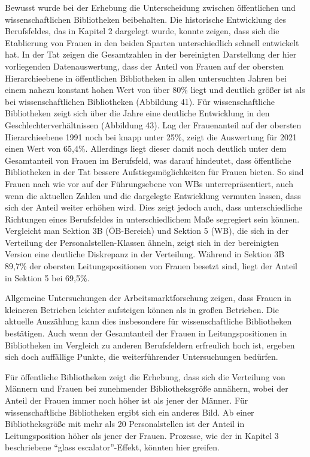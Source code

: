 \documentclass[a4paper,
fontsize=11pt,
oneside,
numbers=noperiodatend,
parskip=half-,
bibliography=totoc,
final
]{scrartcl}
\begin{document}
Bewusst wurde bei der Erhebung die Unterscheidung zwischen öffentlichen
und wissenschaftlichen Bibliotheken beibehalten. Die historische
Entwicklung des Berufsfeldes, das in Kapitel 2 dargelegt wurde, konnte
zeigen, dass sich die Etablierung von Frauen in den beiden Sparten
unterschiedlich schnell entwickelt hat. In der Tat zeigen die
Gesamtzahlen in der bereinigten Darstellung der hier vorliegenden
Datenauswertung, dass der Anteil von Frauen auf der obersten
Hierarchieebene in öffentlichen Bibliotheken in allen untersuchten
Jahren bei einem nahezu konstant hohen Wert von über 80\% liegt und
deutlich größer ist als bei wissenschaftlichen Bibliotheken (Abbildung
41). Für wissenschaftliche Bibliotheken zeigt sich über die Jahre eine
deutliche Entwicklung in den Geschlechterverhältnissen (Abbildung 43).
Lag der Frauenanteil auf der obersten Hierarchieebene 1991 noch bei
knapp unter 25\%, zeigt die Auswertung für 2021 einen Wert von 65,4\%.
Allerdings liegt dieser damit noch deutlich unter dem Gesamtanteil von
Frauen im Berufsfeld, was darauf hindeutet, dass öffentliche
Bibliotheken in der Tat bessere Aufstiegsmöglichkeiten für Frauen
bieten. So sind Frauen nach wie vor auf der Führungsebene von WBs
unterrepräsentiert, auch wenn die aktuellen Zahlen und die dargelegte
Entwicklung vermuten lassen, dass sich der Anteil weiter erhöhen wird.
Dies zeigt jedoch auch, dass unterschiedliche Richtungen eines
Berufsfeldes in unterschiedlichem Maße segregiert sein können.
Vergleicht man Sektion 3B (ÖB-Bereich) und Sektion 5 (WB), die sich in
der Verteilung der Personalstellen-Klassen ähneln, zeigt sich in der
bereinigten Version eine deutliche Diskrepanz in der Verteilung. Während
in Sektion 3B 89,7\% der obersten Leitungspositionen von Frauen besetzt
sind, liegt der Anteil in Sektion 5 bei 69,5\%.

Allgemeine Untersuchungen der Arbeitsmarktforschung zeigen, dass Frauen
in kleineren Betrieben leichter aufsteigen können als in großen
Betrieben. Die aktuelle Auszählung kann dies insbesondere für
wissenschaftliche Bibliotheken bestätigen. Auch wenn der Gesamtanteil
der Frauen in Leitungspositionen in Bibliotheken im Vergleich zu anderen
Berufsfeldern erfreulich hoch ist, ergeben sich doch auffällige Punkte,
die weiterführender Untersuchungen bedürfen.

Für öffentliche Bibliotheken zeigt die Erhebung, dass sich die
Verteilung von Männern und Frauen bei zunehmender Bibliotheksgröße
annähern, wobei der Anteil der Frauen immer noch höher ist als jener der
Männer. Für wissenschaftliche Bibliotheken ergibt sich ein anderes Bild.
Ab einer Bibliotheksgröße mit mehr als 20 Personalstellen ist der Anteil
in Leitungsposition höher als jener der Frauen. Prozesse, wie der in
Kapitel 3 beschriebene \enquote{glass escalator}-Effekt, könnten hier
greifen.
\end{document}

